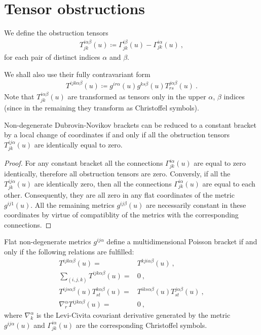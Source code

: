 \section{Tensor obstructions}

\begin{definition}
    We define the obstruction tensors
    \begin{align}
        T^{i \alpha \beta}_{jk} (u) \coloneqq \Gamma^{i \beta}_{jk}(u) - \Gamma^{i \alpha}_{jk}(u) \:,
    \end{align}
    for each pair of distinct indices $\alpha$ and $\beta$.
\end{definition}
We shall also use their fully contravariant form
\begin{align}
    T^{ijk \alpha \beta}(u) \coloneqq g^{i r \alpha}(u) g^{ks \beta}(u) T^{j \alpha \beta}_{rs} (u) \:.
\end{align}
Note that $T^{i \alpha \beta}_{jk} (u)$ are transformed as tensors only in the upper $\alpha$, $\beta$ indices (since in the remaining they transform as Christoffel symbols).

\begin{lemma} \label{lemma:T=0}
    Non-degenerate Dubrovin-Novikov brackets can be reduced to a constant bracket by a local change of coordinates if and only if all the obstruction tensors $T^{ij \alpha}_{jk}(u)$ are identically equal to zero.
\end{lemma}
\begin{proof}
    For any constant bracket all the connections $\Gamma^{i\alpha}_{jk}(u)$ are equal to zero identically, therefore all obstruction tensors are zero. Conversly, if all the $T^{ij \alpha}_{jk}(u)$ are identically zero, then all the connections $\Gamma^{i\alpha}_{jk}(u)$ are equal to each other. Consequently, they are all zero in any flat coordinates of the metric $g^{ij 1}(u)$. All the remaining metrics $g^{ij \beta}(u)$ are necessarily constant in these coordinates by virtue of compatiblity of the metrics with the corresponding connections.
\end{proof}


\begin{theorem}[Mokhov]
    Flat non-degenerate metrics $g^{ij \alpha}$ define a multidimensional Poisson bracket if and only if the following relations are fulfilled:
    \begin{align}
        T^{ijk \alpha \beta}(u) =& T^{kji \alpha \beta}(u) \:, \label{eq:Mochov-1}\\
        \sum_{(i,j,k)} T^{ijk \alpha \beta}(u) =& 0 \:, \label{eq:Mochov-2}\\
        T^{ij s \alpha \beta}(u) T^{k \alpha \beta}_{st}(u) =& T^{i k s \alpha \beta}(u) T^{j \alpha \beta}_{st} (u) \:, \label{eq:Mochov-3}\\
        \nabla^\alpha_r T^{ijk \alpha \beta}(u) =& 0 \:, \label{eq:Mochov-4}
    \end{align}
    where $\nabla^\alpha_k$ is the Levi-Civita covariant derivative generated by the metric $g^{ij \alpha}(u)$ and $\Gamma^{i \alpha}_{jk}(u)$ are the corresponding Christoffel symbols. 
\end{theorem}

